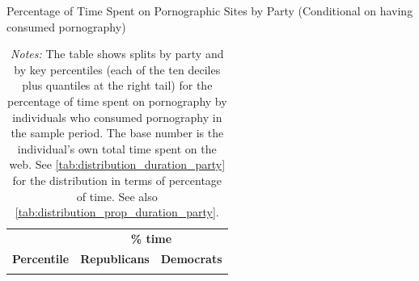 \documentclass[12pt,twoside]{article}
\begin{document}
\begin{table}[ht] \centering \small \setlength\tabcolsep{10 pt}
	\caption{Percentage of Time Spent on Pornographic Sites by Party (Conditional on having consumed pornography)}
	\label{tab:distribution_prop_duration_party_mar}
	\begin{adjustbox}{max width=\textwidth}
		\begin{tabular}{crr}
			\toprule
			\multicolumn{1}{l}{\textbf{}}&\multicolumn{2}{c}{\textbf{\% time}}\\
			\cmidrule(l){2-3}
			\multicolumn{1}{l}{\textbf{Percentile}}&\multicolumn{1}{c}{\textbf{Republicans}}&\multicolumn{1}{c}{\textbf{Democrats}}\\
			\midrule
			\\
			\bottomrule
		\end{tabular}
	\end{adjustbox}
	\caption*{\footnotesize \emph{Notes:} 
		The table shows splits by party and by key percentiles (each of the ten deciles plus quantiles at the right tail) for the percentage of time spent on pornography by individuals who consumed pornography in the sample period. 
        The base number is the individual's own total time spent on the web.
		See \cref{tab:distribution_duration_party} for the distribution in terms of percentage of time.
          See also \cref{tab:distribution_prop_duration_party}.
	}
\end{table}
\end{document}

